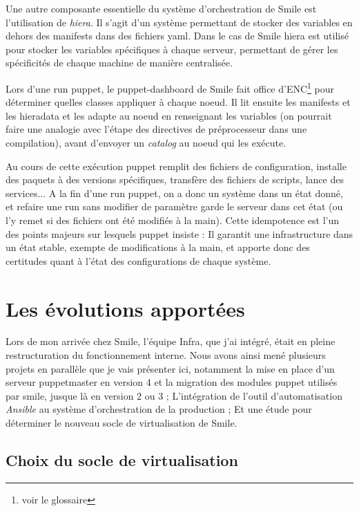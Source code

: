 \documentclass[14 pt]{extreport}
\begin{document}
\newpage
Une autre composante essentielle du système d'orchestration de Smile est l'utilisation de \emph{hiera}. Il s'agit d'un système permettant de stocker des variables en dehors des manifests dans des fichiers yaml. Dans le cas de Smile hiera est utilisé pour stocker les variables spécifiques à chaque serveur, permettant de gérer les spécificités de chaque machine de manière centralisée.

Lors d'une run puppet, le puppet-dashboard de Smile fait office d'ENC\footnote{voir le glossaire} pour déterminer quelles classes appliquer à chaque noeud. Il lit ensuite les manifests et les hieradata et les adapte au noeud en renseignant les variables (on pourrait faire une analogie avec l'étape des directives de préprocesseur dans une compilation), avant d'envoyer un \emph{catalog} au noeud qui les exécute.

Au cours de cette exécution puppet remplit des fichiers de configuration, installe des paquets à des versions spécifiques, transfère des fichiers de scripts, lance des services... A la fin d'une run puppet, on a donc un système dans un état donné, et refaire une run sans modifier de paramètre garde le serveur dans cet état (ou l'y remet si des fichiers ont été modifiés à la main). Cette idempotence est l'un des points majeurs sur lesquels puppet insiste : Il garantit une infrastructure dans un état stable, exempte de modifications à la main, et apporte donc des certitudes quant à l'état des configurations de chaque système.

\chapter{Les évolutions apportées}

Lors de mon arrivée chez Smile, l'équipe Infra, que j'ai intégré, était en pleine restructuration du fonctionnement interne. Nous avons ainsi mené plusieurs projets en parallèle que je vais présenter ici, notamment la mise en place d'un serveur puppetmaster en version 4 et la migration des modules puppet utilisés par smile, jusque là en version 2 ou 3 ; L'intégration de l'outil d'automatisation \emph{Ansible} au système d'orchestration de la production ; Et une étude pour déterminer le nouveau socle de virtualisation de Smile.

\section{Choix du socle de virtualisation}
\end{document}

